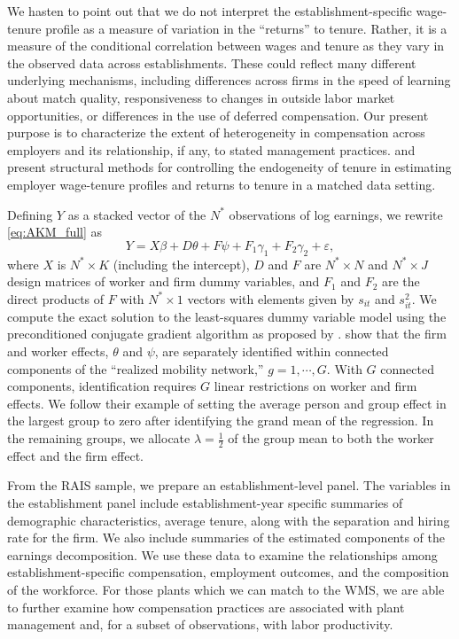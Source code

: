 	We hasten to point out that we do not interpret the establishment-specific wage-tenure profile as a measure of variation in the ``returns'' to tenure. Rather, it is a measure of the conditional correlation between wages and tenure as they vary in the observed data across establishments. These could reflect many different underlying mechanisms, including differences across firms in the speed of learning about match quality, responsiveness to changes in outside labor market opportunities, or differences in the use of deferred compensation. Our present purpose is to characterize the extent of heterogeneity in compensation across employers and its relationship, if any, to stated management practices. \citet{Abowd2006} and \citet{Buchinsky2010} present structural methods for controlling the endogeneity of tenure in estimating employer wage-tenure profiles and returns to tenure in a matched data setting. 

	 
	Defining $Y$ as a stacked vector of the $N^*$ observations of log earnings, we rewrite \eqref{eq:AKM_full} as
		\begin{equation}
		\label{eq:AKM_mat}
		Y = X\beta +D\theta + F\psi + F_1\gamma_1 +F_2\gamma_2 +\varepsilon,
		\end{equation}
	where $X$ is $N^* \times K$ (including the intercept), $D$ and $F$ are $N^* \times N$ and $N^* \times J$ design matrices of worker and firm dummy variables, and $F_1$ and $F_2$ are the direct products of $F$ with $N^* \times 1$ vectors with elements given by $s_{it}$ and $s_{it}^2$. We compute the exact solution to the least-squares dummy variable model using the preconditioned conjugate gradient algorithm as proposed by \citet{abowd2002}. 
	\citet{abowd2002} show that the firm and worker effects, $\theta$ and $\psi$, are separately identified within connected components of the ``realized mobility network,'' $g =1,\cdots,G$. With $G$ connected components, identification requires $G$ linear restrictions on worker and firm effects. We follow their example of setting the average person and group effect in the largest group to zero after identifying the grand mean of the regression. In the remaining groups, we allocate $\lambda = \frac{1}{2}$ of the group mean to both the worker effect and the firm effect. 


	From the RAIS sample, we prepare an establishment-level panel. The variables in the establishment panel include establishment-year specific summaries of demographic characteristics, average tenure, along with the separation and hiring rate for the firm. We also include summaries of the estimated components of the earnings decomposition.  We use these data to examine the relationships among establishment-specific compensation, employment outcomes, and the composition of the workforce.  For those plants which we can match to the WMS, we are able to further examine how compensation practices are associated with plant management and, for a subset of observations, with labor productivity.

